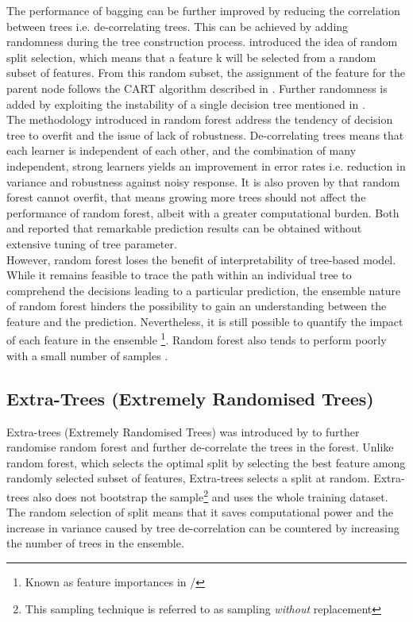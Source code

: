 The performance of bagging can be further improved by reducing the correlation between trees i.e. de-correlating trees. This can be achieved by adding randomness during the tree construction process.  introduced the idea of random split selection, which means that a feature k will be selected from a random subset of features. From this random subset, the assignment of the feature for the parent node follows the CART algorithm described in . Further randomness is added by exploiting the instability of a single decision tree mentioned in .\\

The methodology introduced in random forest address the tendency of decision tree to overfit and the issue of lack of robustness. De-correlating trees means that each learner is independent of each other, and the combination of many independent, strong learners yields an improvement in error rates i.e. reduction in variance and robustness against noisy response. It is also proven by  that random forest cannot overfit, that means growing more trees should not affect the performance of random forest, albeit with a greater computational burden. Both  and  reported that remarkable prediction results can be obtained without extensive tuning of tree parameter. \\

However, random forest loses the benefit of interpretability of tree-based model. While it remains feasible to trace the path within an individual tree to comprehend the decisions leading to a particular prediction, the ensemble nature of random forest hinders the possibility to gain an understanding between the feature and the prediction. Nevertheless, it is still possible to quantify the impact of each feature in the ensemble \footnote{Known as feature importances in \scikit/}. Random forest also tends to perform poorly with a small number of samples .\\

\subsection{Extra-Trees (Extremely Randomised Trees)}\label{sec:et_theo}

Extra-trees (Extremely Randomised Trees) was introduced by  to further randomise random forest and further de-correlate the trees in the forest. Unlike random forest, which selects the optimal split by selecting the best feature among randomly selected subset of features, Extra-trees selects a split at random. Extra-trees also does not bootstrap the sample\footnote{This sampling technique is referred to as sampling \emph{without} replacement} and uses the whole training dataset. The random selection of split means that it saves computational power and the increase in variance caused by tree de-correlation can be countered by increasing the number of trees in the ensemble.\\ 

